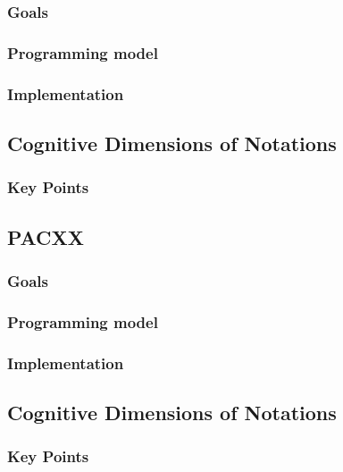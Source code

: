 \subsubsection{Goals}

\subsubsection{Programming model}

\subsubsection{Implementation}

\subsection{Cognitive Dimensions of Notations}

\subsubsection{Key Points}


\subsection{PACXX}

\subsubsection{Goals}

\subsubsection{Programming model}

\subsubsection{Implementation}

\subsection{Cognitive Dimensions of Notations}

\subsubsection{Key Points}